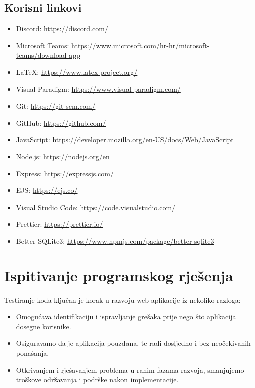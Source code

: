 		\subsection*{Korisni linkovi}
			\begin{itemize}
				\item Discord: \url{https://discord.com/}
				\item Microsoft Teams: \url{https://www.microsoft.com/hr-hr/microsoft-teams/download-app}
				\item LaTeX: \url{https://www.latex-project.org/}
				\item Visual Paradigm: \url{https://www.visual-paradigm.com/}
				\item Git: \url{https://git-scm.com/}
				\item GitHub: \url{https://github.com/}
				\item JavaScript: \url{https://developer.mozilla.org/en-US/docs/Web/JavaScript}
				\item Node.js: \url{https://nodejs.org/en}
				\item Express: \url{https://expressjs.com/}
				\item EJS: \url{https://ejs.co/}
				\item Visual Studio Code: \url{https://code.visualstudio.com/}
				\item Prettier: \url{https://prettier.io/}
				\item Better SQLite3: \url{https://www.npmjs.com/package/better-sqlite3}
			\end{itemize}

				
			\eject 
		
	
		\section{Ispitivanje programskog rješenja}

			Testiranje koda ključan je korak u razvoju web aplikacije iz nekoliko razloga:
			\begin{itemize}
				\item Omogućava identifikaciju i ispravljanje grešaka prije nego što aplikacija dosegne korisnike.
				\item Osiguravamo da je aplikacija pouzdana, te radi dosljedno i bez neočekivanih ponašanja.
				\item Otkrivanjem i rješavanjem problema u ranim fazama razvoja, smanjujemo troškove održavanja i podrške nakon implementacije.
			\end{itemize}

